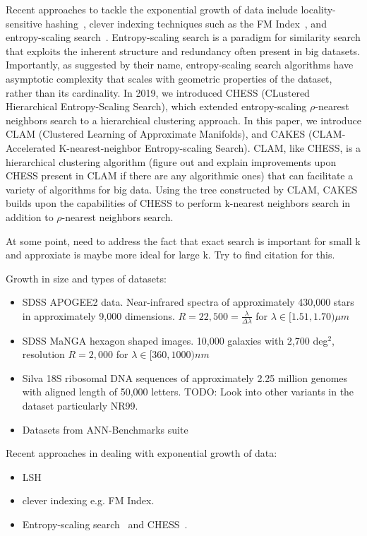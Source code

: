 Recent approaches to tackle the exponential growth of data include locality-sensitive hashing~\cite{bingham2001random}, 
clever indexing techniques such as the FM Index~\cite{ferragina2005indexing}, and entropy-scaling search~\cite{yu2015entropy}. 
Entropy-scaling search is a paradigm for similarity search that exploits the inherent structure and redundancy often present in big datasets.
Importantly, as suggested by their name, entropy-scaling search algorithms have asymptotic complexity that scales with geometric properties of the dataset,
rather than its cardinality. In 2019, we introduced CHESS (CLustered Hierarchical Entropy-Scaling Search), which extended entropy-scaling $\rho$-nearest 
neighbors search to a hierarchical clustering approach. In this paper, we introduce CLAM (Clustered Learning of Approximate Manifolds), and CAKES (CLAM-Accelerated K-nearest-neighbor 
Entropy-scaling Search). CLAM, like CHESS, is a hierarchical clustering algorithm (figure out and explain improvements upon CHESS present in CLAM if there are any algorithmic ones)
that can facilitate a variety of algorithms for big data. Using the tree constructed by CLAM, CAKES builds upon the capabilities of CHESS to perform 
k-nearest neighbors search in addition to $\rho$-nearest neighbors search.


At some point, need to address the fact that exact search is important for small k and approxiate 
is maybe more ideal for large k. Try to find citation for this. 

Growth in size and types of datasets:
\begin{itemize}
    \item SDSS APOGEE2 data. Near-infrared spectra of approximately 430,000 stars in approximately 9,000 dimensions. $R=22,500 = \frac{\lambda}{\Delta \lambda}$ for $\lambda \in [1.51, 1.70) \mu m$
    \item SDSS MaNGA hexagon shaped images. 10,000 galaxies with 2,700 deg$^2$, resolution $R=2,000$ for $\lambda \in [360, 1000) nm$
    \item Silva 18S ribosomal DNA sequences of approximately 2.25 million genomes with aligned length of 50,000 letters. TODO: Look into other variants in the dataset particularly NR99.
    \item Datasets from ANN-Benchmarks suite
\end{itemize}

Recent approaches in dealing with exponential growth of data:
\begin{itemize}
    \item LSH
    \item clever indexing e.g. FM Index.
    \item Entropy-scaling search~\cite{yu2015entropy} and CHESS~\cite{ishaq2019clustered}.
\end{itemize}

